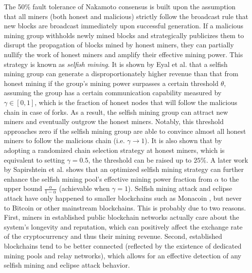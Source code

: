The 50\% fault tolerance of Nakamoto consensus is built upon the assumption that all miners (both honest and malicious) strictly follow the broadcast rule that new blocks are broadcast immediately upon successful generation. If a malicious mining group withholds newly mined blocks and strategically publicizes them to disrupt the propagation of blocks mined by honest miners, they can partially nullify the work of honest miners and amplify their effective mining power. This strategy is known as \textit{selfish mining}. 
It is shown by Eyal et al.  that a selfish mining group can generate a disproportionately higher revenue than that from honest mining if the group's mining power surpasses a certain threshold $\theta$, assuming the group has a certain communication capability measured by $\gamma\in[0,1]$, which is the fraction of honest nodes that will follow the malicious chain in case of forks. 
As a result, the selfish mining group can attract new miners and eventually outgrow the honest miners. Notably, this threshold approaches zero if the selfish mining group are able to convince almost all honest miners to follow the malicious chain (i.e. $\gamma\rightarrow1$). It is also shown that by adopting a randomized chain selection strategy at honest miners, which is equivalent to setting $\gamma=0.5$, the threshold can be raised up to $25\%$. A later work by Sapirshtein et al.  shows that an optimized selfish mining strategy can further enhance the selfish mining pool's effective mining power fraction from $\alpha$ to the upper bound $\frac{\alpha}{1-\alpha}$ (achievable when $\gamma=1$).
Selfish mining attack and eclipse attack have only happened to smaller blockchains such as Monacoin , but never to Bitcoin or other mainstream blockchains. This is probably due to two reasons. First, miners in established public blockchain networks actually care about the system's longevity and reputation, which can positively affect the exchange rate of the cryptocurrency and thus their mining revenue. Second, established blockchains tend to be better connected (reflected by the existence of dedicated mining pools and relay networks), which allows for an effective detection of any selfish mining and eclipse attack behavior.

